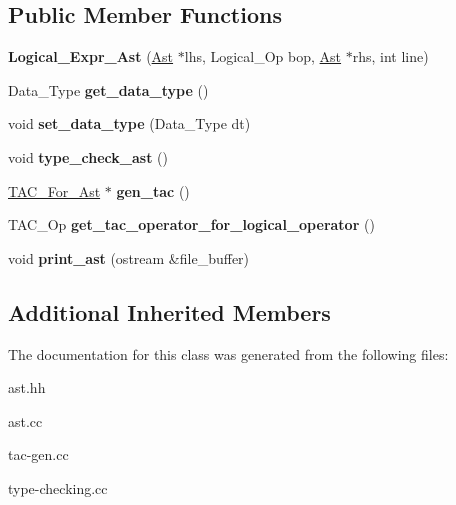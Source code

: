 \subsection*{Public Member Functions}
\begin{DoxyCompactItemize}
\item 
\mbox{\label{classLogical__Expr__Ast_ae83621b708b8c6650cca22edd074c303}} 
{\bfseries Logical\+\_\+\+Expr\+\_\+\+Ast} (\hyperlink{classAst}{Ast} $\ast$lhs, Logical\+\_\+\+Op bop, \hyperlink{classAst}{Ast} $\ast$rhs, int line)
\item 
\mbox{\label{classLogical__Expr__Ast_ade9dc17ee7bfe6c416c94e6daf5f2f6b}} 
Data\+\_\+\+Type {\bfseries get\+\_\+data\+\_\+type} ()
\item 
\mbox{\label{classLogical__Expr__Ast_a8536bd1f73b9d237db6ddd65e5f84878}} 
void {\bfseries set\+\_\+data\+\_\+type} (Data\+\_\+\+Type dt)
\item 
\mbox{\label{classLogical__Expr__Ast_ab361db97f43e08e918a170305d92da9a}} 
void {\bfseries type\+\_\+check\+\_\+ast} ()
\item 
\mbox{\label{classLogical__Expr__Ast_aec6696045b9417bbccfc3402261f8c27}} 
\hyperlink{classTAC__For__Ast}{T\+A\+C\+\_\+\+For\+\_\+\+Ast} $\ast$ {\bfseries gen\+\_\+tac} ()
\item 
\mbox{\label{classLogical__Expr__Ast_a280335e08b37cbc2e1b11e16b31407f9}} 
T\+A\+C\+\_\+\+Op {\bfseries get\+\_\+tac\+\_\+operator\+\_\+for\+\_\+logical\+\_\+operator} ()
\item 
\mbox{\label{classLogical__Expr__Ast_a68f261c9b9e56fd60fcdb3f0dd634d02}} 
void {\bfseries print\+\_\+ast} (ostream \&file\+\_\+buffer)
\end{DoxyCompactItemize}
\subsection*{Additional Inherited Members}


The documentation for this class was generated from the following files\+:\begin{DoxyCompactItemize}
\item 
ast.\+hh\item 
ast.\+cc\item 
tac-\/gen.\+cc\item 
type-\/checking.\+cc\end{DoxyCompactItemize}
